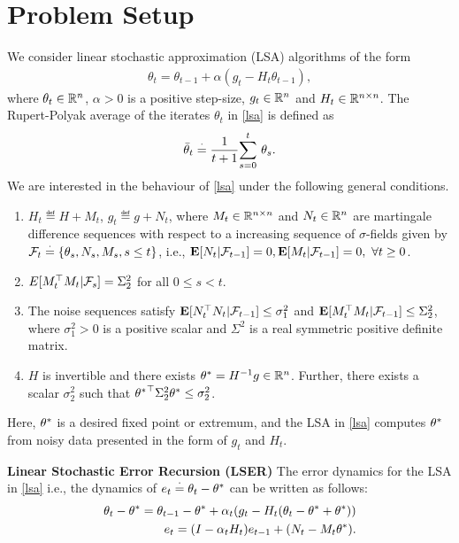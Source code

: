 \section{Problem Setup}
We consider linear stochastic approximation (LSA) algorithms of the form
\begin{align}\label{lsa}
\theta_{t}=\theta_{t-1}+\alpha(g_t-H_t\theta_{t-1}),
\end{align}
where $\theta_t\in \R^n$, $\alpha>0$ is a positive step-size, $g_t\in \R^n$ and $H_t\in \R^{n\times n}$. The Rupert-Polyak average of the iterates $\theta_t$ in \eqref{lsa} is defined as
\begin{align}\label{rp} \tb_t\eqdef \frac{1}{t+1}\ous{\sum}{s=0}{t} \theta_s. \end{align}
We are interested in the behaviour of \eqref{lsa} under the following general conditions.
\begin{assumption}\label{genlsa}
\begin{enumerate}
\item\label{mart} $H_t\eqdef H+M_t$, $g_t\eqdef g+N_t$, where $M_t\in \R^{n\times n}$ and $N_t\in \R^n$ are martingale difference sequences with respect to a increasing sequence of $\sigma$-fields given by $\F_t\eqdef \{\theta_s, N_s,M_s,s\leq t\}$, i.e., $\E[N_t|\F_{t-1}]=0,\E[M_t|\F_{t-1}]=0,~\forall t\geq 0$.
\item \label{secondmom} $E[M_t^\top M_t| \F_{s}]=\Sigma_2^2$ for all $0\leq s< t$.
\item \label{noise} The noise sequences satisfy $\E[N_t^\top N_t|\F_{t-1}]\leq \sigma_1^2$ and $\E[M_t^\top M_t|\F_{t-1}]\leq \Sigma_2^2$, where $\sigma_1^2>0$ is a positive scalar and $\Sigma^2$ is a real symmetric positive definite matrix.
\item \label{mat} $H$ is invertible and there exists $\ts=H^{-1}g\in\R^n$. Further, there exists a scalar $\sigma_2^2$ such that ${\ts}^\top\Sigma_2^2\ts\leq \sigma_2^2$.
\end{enumerate}
\end{assumption}
Here, $\ts$ is a desired fixed point or extremum, and the LSA in \eqref{lsa} computes $\ts$ from noisy data presented in the form of $g_t$ and $H_t$.\par
\textbf{Linear Stochastic Error Recursion (LSER)} The error dynamics for the LSA in \eqref{lsa} i.e., the dynamics of $e_t\eqdef\theta_t-\ts$ can be written as follows:
\begin{align}\label{errprelim}
\theta_t-\ts=\theta_{t-1}-\ts+\alpha_t(g_t -H_t(\theta_t-\ts+\ts))\nn\\
e_t=(I-\alpha_t H_t)e_{t-1}+(N_t-M_t\ts).
\end{align}
